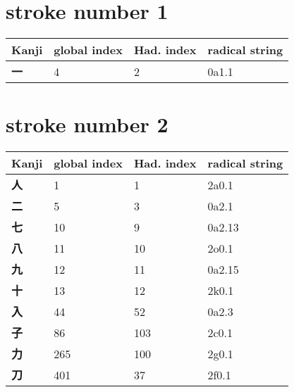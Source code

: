 \section{stroke number 1}
  \begin{longtable}[c]{llll}
    \bfseries Kanji & \bfseries global index & \bfseries Had. index & \bfseries radical string\\\hline\endhead
    \bfseries 一 & 4 & 2 & 0a1.1\\
  \end{longtable}
\section{stroke number 2}
  \begin{longtable}[c]{llll}
    \bfseries Kanji & \bfseries global index & \bfseries Had. index & \bfseries radical string\\\hline\endhead
    \bfseries 人 & 1 & 1 & 2a0.1\\
    \bfseries 二 & 5 & 3 & 0a2.1\\
    \bfseries 七 & 10 & 9 & 0a2.13\\
    \bfseries 八 & 11 & 10 & 2o0.1\\
    \bfseries 九 & 12 & 11 & 0a2.15\\
    \bfseries 十 & 13 & 12 & 2k0.1\\
    \bfseries 入 & 44 & 52 & 0a2.3\\
    \bfseries 子 & 86 & 103 & 2c0.1\\
    \bfseries 力 & 265 & 100 & 2g0.1\\
    \bfseries 刀 & 401 & 37 & 2f0.1\\
  \end{longtable}
